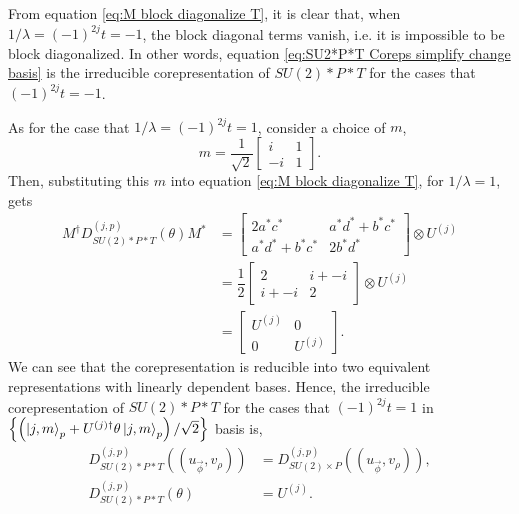 \documentclass[preprint, 12pt]{revtex4-2}
\numberwithin{equation}{section}
\begin{document}
From equation \ref{eq:M block diagonalize T}, it is clear that, when $1/\lambda=(-1)^{2j}t=-1$, the block diagonal terms vanish, i.e. it is impossible to be block diagonalized. In other words, equation \ref{eq:SU2*P*T Coreps simplify change basis} is the irreducible corepresentation of $SU(2)\ast P\ast T$ for the cases that $(-1)^{2j}t=-1$.

As for the case that $1/\lambda=(-1)^{2j}t=1$, consider a choice of $m$,
\begin{equation}\label{eq:m lambda one}
    m = \dfrac{1}{\sqrt{2}}\begin{bmatrix}
        i & 1 \\
        -i & 1
    \end{bmatrix}.
\end{equation}
Then, substituting this $m$ into equation \ref{eq:M block diagonalize T}, for $1/\lambda=1$, gets
\begin{equation}\label{eq:M block diagonalized T}
    \begin{aligned}
        M^\dagger D_{SU(2)\ast P\ast T}^{(j,p)}(\theta)M^\ast &= \begin{bmatrix}2a^\ast c^\ast & a^\ast d^\ast + b^\ast c^\ast \\ a^\ast d^\ast + b^\ast c^\ast & 2b^\ast d^\ast\end{bmatrix} \otimes U^{(j)} \\
        &= \dfrac{1}{2}\begin{bmatrix}2 & i + -i \\ i + -i & 2\end{bmatrix} \otimes U^{(j)} \\
        &= \begin{bmatrix}U^{(j)} & 0 \\ 0 & U^{(j)}\end{bmatrix}.
    \end{aligned}
\end{equation}
We can see that the corepresentation is reducible into two equivalent representations with linearly dependent bases. Hence, the irreducible corepresentation of $SU(2)\ast P\ast T$ for the cases that $(-1)^{2j}t=1$ in $\left\{\left(\ket{j,m}_p+U^{(j)\dagger}\theta\ket{j,m}_p\right)/\sqrt{2}\right\}$ basis is,
\begin{equation}\label{eq:SU2*P*T Coreps lambda one}
    \begin{aligned}
        D_{SU(2)\ast P\ast T}^{(j,p)}((u_{\vec{\phi}}, v_\rho))
        &= D_{SU(2)\times P}^{(j,p)}((u_{\vec{\phi}}, v_\rho)), \\
        D_{SU(2)\ast P\ast T}^{(j,p)}(\theta) 
        &= U^{(j)}.
    \end{aligned}
\end{equation}
\end{document}
